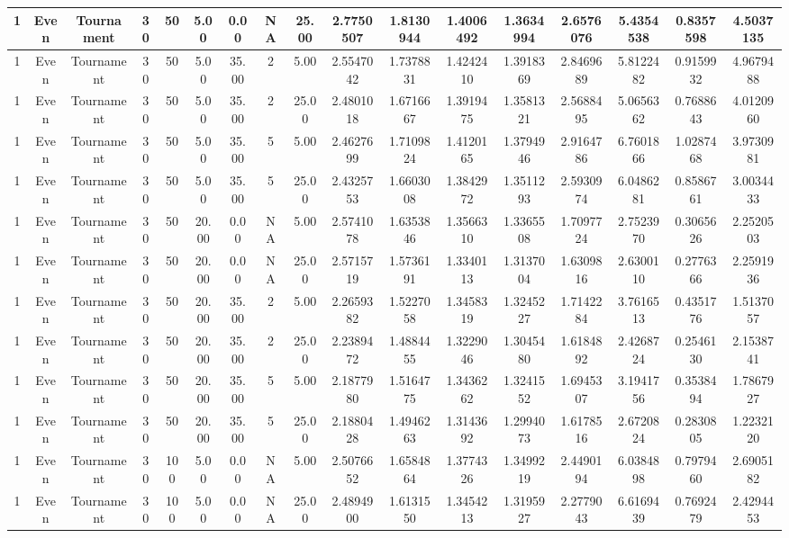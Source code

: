 \documentclass[a4paper]{article}
\begin{document}
\begin{center}
\begin{tabular}{ | c | c | c | c | c | c | c | c | c | c | c | c | c | c | c | c | c | }
		\hline
		1	&	Even	&	Tournament	&	30	&	50	&	5.00	&	0.00	&	NA	&	25.00	&	2.7750507	&	1.8130944	&	1.4006492	&	1.3634994	&	2.6576076	&	5.4354538	&	0.8357598	&	4.5037135 \\
		\hline
		1	&	Even	&	Tournament	&	30	&	50	&	5.00	&	35.00	&	2	&	5.00	&	2.5547042	&	1.7378831	&	1.4242410	&	1.3918369	&	2.8469689	&	5.8122482	&	0.9159932	&	4.9679488 \\
		\hline
		1	&	Even	&	Tournament	&	30	&	50	&	5.00	&	35.00	&	2	&	25.00	&	2.4801018	&	1.6716667	&	1.3919475	&	1.3581321	&	2.5688495	&	5.0656362	&	0.7688643	&	4.0120960 \\
		\hline
		1	&	Even	&	Tournament	&	30	&	50	&	5.00	&	35.00	&	5	&	5.00	&	2.4627699	&	1.7109824	&	1.4120165	&	1.3794946	&	2.9164786	&	6.7601866	&	1.0287468	&	3.9730981 \\
		\hline
		1	&	Even	&	Tournament	&	30	&	50	&	5.00	&	35.00	&	5	&	25.00	&	2.4325753	&	1.6603008	&	1.3842972	&	1.3511293	&	2.5930974	&	6.0486281	&	0.8586761	&	3.0034433 \\
		\hline
		1	&	Even	&	Tournament	&	30	&	50	&	20.00	&	0.00	&	NA	&	5.00	&	2.5741078	&	1.6353846	&	1.3566310	&	1.3365508	&	1.7097724	&	2.7523970	&	0.3065626	&	2.2520503 \\
		\hline
		1	&	Even	&	Tournament	&	30	&	50	&	20.00	&	0.00	&	NA	&	25.00	&	2.5715719	&	1.5736191	&	1.3340113	&	1.3137004	&	1.6309816	&	2.6300110	&	0.2776366	&	2.2591936 \\
		\hline
		1	&	Even	&	Tournament	&	30	&	50	&	20.00	&	35.00	&	2	&	5.00	&	2.2659382	&	1.5227058	&	1.3458319	&	1.3245227	&	1.7142284	&	3.7616513	&	0.4351776	&	1.5137057 \\
		\hline
		1	&	Even	&	Tournament	&	30	&	50	&	20.00	&	35.00	&	2	&	25.00	&	2.2389472	&	1.4884455	&	1.3229046	&	1.3045480	&	1.6184892	&	2.4268724	&	0.2546130	&	2.1538741 \\
		\hline
		1	&	Even	&	Tournament	&	30	&	50	&	20.00	&	35.00	&	5	&	5.00	&	2.1877980	&	1.5164775	&	1.3436262	&	1.3241552	&	1.6945307	&	3.1941756	&	0.3538494	&	1.7867927 \\
		\hline
		1	&	Even	&	Tournament	&	30	&	50	&	20.00	&	35.00	&	5	&	25.00	&	2.1880428	&	1.4946263	&	1.3143692	&	1.2994073	&	1.6178516	&	2.6720824	&	0.2830805	&	1.2232120 \\
		\hline
		1	&	Even	&	Tournament	&	30	&	100	&	5.00	&	0.00	&	NA	&	5.00	&	2.5076652	&	1.6584864	&	1.3774326	&	1.3499219	&	2.4490194	&	6.0384898	&	0.7979460	&	2.6905182 \\
		\hline
		1	&	Even	&	Tournament	&	30	&	100	&	5.00	&	0.00	&	NA	&	25.00	&	2.4894900	&	1.6131550	&	1.3454213	&	1.3195927	&	2.2779043	&	6.6169439	&	0.7692479	&	2.4294453 \\

\end{tabular}
\end{center}
\end{document}
